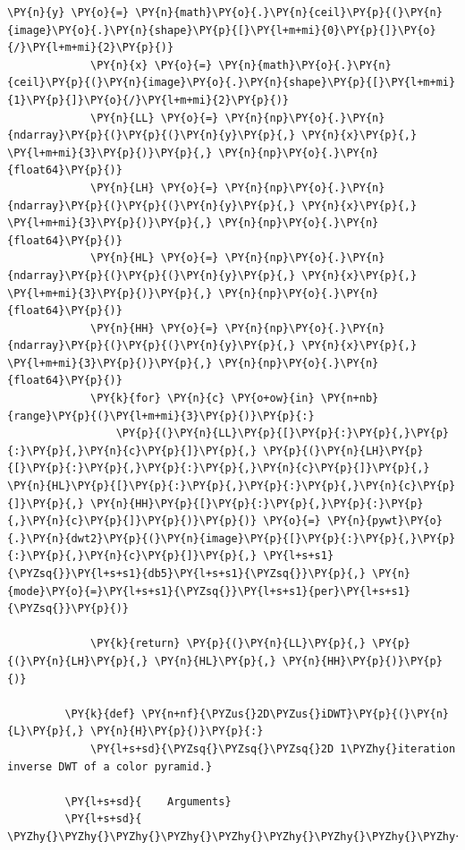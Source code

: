 \begin{Verbatim}[commandchars=\\\{\}]
             \PY{n}{y} \PY{o}{=} \PY{n}{math}\PY{o}{.}\PY{n}{ceil}\PY{p}{(}\PY{n}{image}\PY{o}{.}\PY{n}{shape}\PY{p}{[}\PY{l+m+mi}{0}\PY{p}{]}\PY{o}{/}\PY{l+m+mi}{2}\PY{p}{)}
             \PY{n}{x} \PY{o}{=} \PY{n}{math}\PY{o}{.}\PY{n}{ceil}\PY{p}{(}\PY{n}{image}\PY{o}{.}\PY{n}{shape}\PY{p}{[}\PY{l+m+mi}{1}\PY{p}{]}\PY{o}{/}\PY{l+m+mi}{2}\PY{p}{)}
             \PY{n}{LL} \PY{o}{=} \PY{n}{np}\PY{o}{.}\PY{n}{ndarray}\PY{p}{(}\PY{p}{(}\PY{n}{y}\PY{p}{,} \PY{n}{x}\PY{p}{,} \PY{l+m+mi}{3}\PY{p}{)}\PY{p}{,} \PY{n}{np}\PY{o}{.}\PY{n}{float64}\PY{p}{)}
             \PY{n}{LH} \PY{o}{=} \PY{n}{np}\PY{o}{.}\PY{n}{ndarray}\PY{p}{(}\PY{p}{(}\PY{n}{y}\PY{p}{,} \PY{n}{x}\PY{p}{,} \PY{l+m+mi}{3}\PY{p}{)}\PY{p}{,} \PY{n}{np}\PY{o}{.}\PY{n}{float64}\PY{p}{)}
             \PY{n}{HL} \PY{o}{=} \PY{n}{np}\PY{o}{.}\PY{n}{ndarray}\PY{p}{(}\PY{p}{(}\PY{n}{y}\PY{p}{,} \PY{n}{x}\PY{p}{,} \PY{l+m+mi}{3}\PY{p}{)}\PY{p}{,} \PY{n}{np}\PY{o}{.}\PY{n}{float64}\PY{p}{)}
             \PY{n}{HH} \PY{o}{=} \PY{n}{np}\PY{o}{.}\PY{n}{ndarray}\PY{p}{(}\PY{p}{(}\PY{n}{y}\PY{p}{,} \PY{n}{x}\PY{p}{,} \PY{l+m+mi}{3}\PY{p}{)}\PY{p}{,} \PY{n}{np}\PY{o}{.}\PY{n}{float64}\PY{p}{)}
             \PY{k}{for} \PY{n}{c} \PY{o+ow}{in} \PY{n+nb}{range}\PY{p}{(}\PY{l+m+mi}{3}\PY{p}{)}\PY{p}{:}
                 \PY{p}{(}\PY{n}{LL}\PY{p}{[}\PY{p}{:}\PY{p}{,}\PY{p}{:}\PY{p}{,}\PY{n}{c}\PY{p}{]}\PY{p}{,} \PY{p}{(}\PY{n}{LH}\PY{p}{[}\PY{p}{:}\PY{p}{,}\PY{p}{:}\PY{p}{,}\PY{n}{c}\PY{p}{]}\PY{p}{,} \PY{n}{HL}\PY{p}{[}\PY{p}{:}\PY{p}{,}\PY{p}{:}\PY{p}{,}\PY{n}{c}\PY{p}{]}\PY{p}{,} \PY{n}{HH}\PY{p}{[}\PY{p}{:}\PY{p}{,}\PY{p}{:}\PY{p}{,}\PY{n}{c}\PY{p}{]}\PY{p}{)}\PY{p}{)} \PY{o}{=} \PY{n}{pywt}\PY{o}{.}\PY{n}{dwt2}\PY{p}{(}\PY{n}{image}\PY{p}{[}\PY{p}{:}\PY{p}{,}\PY{p}{:}\PY{p}{,}\PY{n}{c}\PY{p}{]}\PY{p}{,} \PY{l+s+s1}{\PYZsq{}}\PY{l+s+s1}{db5}\PY{l+s+s1}{\PYZsq{}}\PY{p}{,} \PY{n}{mode}\PY{o}{=}\PY{l+s+s1}{\PYZsq{}}\PY{l+s+s1}{per}\PY{l+s+s1}{\PYZsq{}}\PY{p}{)}
         
             \PY{k}{return} \PY{p}{(}\PY{n}{LL}\PY{p}{,} \PY{p}{(}\PY{n}{LH}\PY{p}{,} \PY{n}{HL}\PY{p}{,} \PY{n}{HH}\PY{p}{)}\PY{p}{)}
         
         \PY{k}{def} \PY{n+nf}{\PYZus{}2D\PYZus{}iDWT}\PY{p}{(}\PY{n}{L}\PY{p}{,} \PY{n}{H}\PY{p}{)}\PY{p}{:}
             \PY{l+s+sd}{\PYZsq{}\PYZsq{}\PYZsq{}2D 1\PYZhy{}iteration inverse DWT of a color pyramid.}
         
         \PY{l+s+sd}{    Arguments}
         \PY{l+s+sd}{    \PYZhy{}\PYZhy{}\PYZhy{}\PYZhy{}\PYZhy{}\PYZhy{}\PYZhy{}\PYZhy{}\PYZhy{}}
         

\end{Verbatim}

